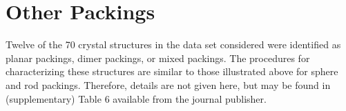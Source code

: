 \documentclass[preprint]{iucr}              %
\begin{document}
\section{Other Packings}

Twelve of the 70 crystal structures in the data set considered were identified as planar packings, dimer packings, or mixed packings.  The procedures for characterizing these structures are similar to those illustrated above for sphere and rod packings.  Therefore, details are not given here, but may be found in (supplementary) Table 6 available from the journal publisher.


\end{document}
